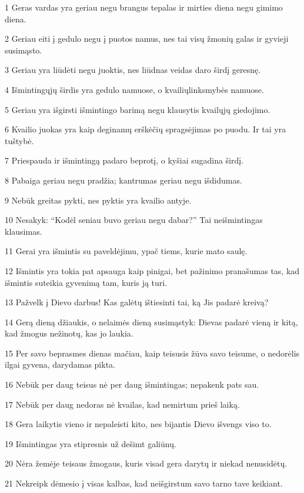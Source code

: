 \par 1 Geras vardas yra geriau negu brangus tepalas ir mirties diena negu gimimo diena. 
\par 2 Geriau eiti į gedulo negu į puotos namus, nes tai visų žmonių galas ir gyvieji susimąsto. 
\par 3 Geriau yra liūdėti negu juoktis, nes liūdnas veidas daro širdį geresnę. 
\par 4 Išmintingųjų širdis yra gedulo namuose, o kvailių­linksmybės namuose. 
\par 5 Geriau yra išgirsti išmintingo barimą negu klausytis kvailųjų giedojimo. 
\par 6 Kvailio juokas yra kaip deginamų erškėčių spragsėjimas po puodu. Ir tai yra tuštybė. 
\par 7 Priespauda ir išmintingą padaro beprotį, o kyšiai sugadina širdį. 
\par 8 Pabaiga geriau negu pradžia; kantrumas geriau negu išdidumas. 
\par 9 Nebūk greitas pykti, nes pyktis yra kvailio antyje. 
\par 10 Nesakyk: “Kodėl seniau buvo geriau negu dabar?” Tai neišmintingas klausimas. 
\par 11 Gerai yra išmintis su paveldėjimu, ypač tiems, kurie mato saulę. 
\par 12 Išmintis yra tokia pat apsauga kaip pinigai, bet pažinimo pranašumas tas, kad išmintis suteikia gyvenimą tam, kuris ją turi. 
\par 13 Pažvelk į Dievo darbus! Kas galėtų ištiesinti tai, ką Jis padarė kreivą? 
\par 14 Gerą dieną džiaukis, o nelaimės dieną susimąstyk: Dievas padarė vieną ir kitą, kad žmogus nežinotų, kas jo laukia. 
\par 15 Per savo beprasmes dienas mačiau, kaip teisusis žūva savo teisume, o nedorėlis ilgai gyvena, darydamas pikta. 
\par 16 Nebūk per daug teisus nė per daug išmintingas; nepakenk pats sau. 
\par 17 Nebūk per daug nedoras nė kvailas, kad nemirtum prieš laiką. 
\par 18 Gera laikytis vieno ir nepaleisti kito, nes bijantis Dievo išvengs viso to. 
\par 19 Išmintingas yra stipresnis už dešimt galiūnų. 
\par 20 Nėra žemėje teisaus žmogaus, kuris visad gera darytų ir niekad nenusidėtų. 
\par 21 Nekreipk dėmesio į visas kalbas, kad neišgirstum savo tarno tave keikiant. 
